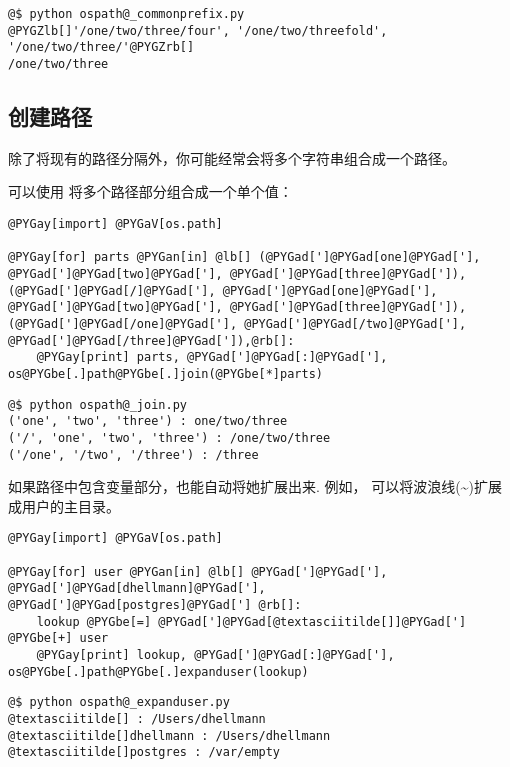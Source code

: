 \documentclass[a4paper,10pt,english]{manual}
\begin{document}
\begin{Verbatim}[commandchars=@\[\]]
@$ python ospath@_commonprefix.py
@PYGZlb[]'/one/two/three/four', '/one/two/threefold', '/one/two/three/'@PYGZrb[]
/one/two/three
\end{Verbatim}


\subsection{创建路径}

除了将现有的路径分隔外，你可能经常会将多个字符串组合成一个路径。

可以使用  将多个路径部分组合成一个单个值：

\begin{Verbatim}[commandchars=@\[\]]
@PYGay[import] @PYGaV[os.path]

@PYGay[for] parts @PYGan[in] @lb[] (@PYGad[']@PYGad[one]@PYGad['], @PYGad[']@PYGad[two]@PYGad['], @PYGad[']@PYGad[three]@PYGad[']),(@PYGad[']@PYGad[/]@PYGad['], @PYGad[']@PYGad[one]@PYGad['], @PYGad[']@PYGad[two]@PYGad['], @PYGad[']@PYGad[three]@PYGad[']),(@PYGad[']@PYGad[/one]@PYGad['], @PYGad[']@PYGad[/two]@PYGad['], @PYGad[']@PYGad[/three]@PYGad[']),@rb[]:
    @PYGay[print] parts, @PYGad[']@PYGad[:]@PYGad['], os@PYGbe[.]path@PYGbe[.]join(@PYGbe[*]parts)
\end{Verbatim}

\begin{Verbatim}[commandchars=@\[\]]
@$ python ospath@_join.py
('one', 'two', 'three') : one/two/three
('/', 'one', 'two', 'three') : /one/two/three
('/one', '/two', '/three') : /three
\end{Verbatim}

如果路径中包含变量部分，也能自动将她扩展出来. 例如，  可以将波浪线(\textasciitilde{})扩展成用户的主目录。

\begin{Verbatim}[commandchars=@\[\]]
@PYGay[import] @PYGaV[os.path]

@PYGay[for] user @PYGan[in] @lb[] @PYGad[']@PYGad['], @PYGad[']@PYGad[dhellmann]@PYGad['], @PYGad[']@PYGad[postgres]@PYGad['] @rb[]:
    lookup @PYGbe[=] @PYGad[']@PYGad[@textasciitilde[]]@PYGad['] @PYGbe[+] user
    @PYGay[print] lookup, @PYGad[']@PYGad[:]@PYGad['], os@PYGbe[.]path@PYGbe[.]expanduser(lookup)
\end{Verbatim}

\begin{Verbatim}[commandchars=@\[\]]
@$ python ospath@_expanduser.py
@textasciitilde[] : /Users/dhellmann
@textasciitilde[]dhellmann : /Users/dhellmann
@textasciitilde[]postgres : /var/empty
\end{Verbatim}
\end{document}
